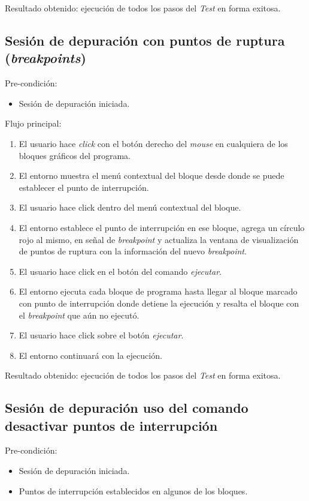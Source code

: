 Resultado obtenido: ejecución de todos los pasos del \emph{Test} en forma exitosa.  


\subsection{Sesión de depuración con puntos de ruptura (\emph{breakpoints})}
Pre-condición:
\begin{itemize}
     \item Sesión de depuración iniciada.
\end{itemize}

Flujo principal:
\begin{enumerate}
	\item
	El usuario hace \emph{click} con el botón derecho del \emph{mouse} en cualquiera de los bloques gráficos del programa.
	\item
	El entorno muestra el menú contextual del bloque desde donde se puede establecer el punto de interrupción.
	\item
	El usuario hace click dentro del menú contextual del bloque.
	\item
	El entorno establece el punto de interrupción en ese bloque, agrega un círculo rojo al mismo, en señal de \emph{breakpoint} y actualiza la ventana de visualización de puntos de ruptura con la información del nuevo \emph{breakpoint}.
	\item
	El usuario hace click en el botón del comando \emph{ejecutar}.
	\item
	El entorno ejecuta cada bloque de programa hasta llegar al bloque marcado con punto de interrupción donde detiene la ejecución y resalta el bloque con el \emph{breakpoint} que aún no ejecutó.
	\item
    El usuario hace click sobre el botón \emph{ejecutar}.
    \item
    El entorno continuará con la ejecución.
\end{enumerate}

Resultado obtenido: ejecución de todos los pasos del \emph{Test} en forma exitosa. 


\subsection{Sesión de depuración uso del comando desactivar puntos de interrupción}
Pre-condición:
\begin{itemize}
	\item Sesión de depuración iniciada.
	\item Puntos de interrupción establecidos en algunos de los bloques.
\end{itemize}


